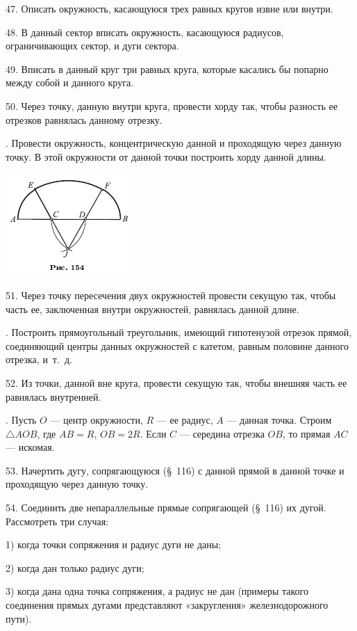 \documentclass[oneside]{book}
\begin{document}
47.
Описать окружность, касающуюся трех равных кругов извне или внутри.

48.
В данный сектор вписать окружность, касающуюся радиусов, ограничивающих сектор, и дуги сектора.

49.
Вписать в данный круг три равных круга, которые касались бы попарно между собой и данного круга.

50.
Через точку, данную внутри круга, провести хорду так, чтобы разность ее отрезков равнялась данному отрезку.

.
Провести окружность, концентрическую данной и проходящую через данную точку.
В этой окружности от данной точки построить хорду данной длины.

\includegraphics{pics/ris-154}

51.
Через точку пересечения двух окружностей провести секущую так, чтобы часть ее, заключенная внутри окружностей, равнялась данной длине.

.
Построить прямоугольный треугольник, имеющий гипотенузой отрезок прямой, соединяющий центры данных окружностей с катетом, равным половине данного отрезка, и~т.~д.

52.
Из точки, данной вне круга, провести секущую так, чтобы внешняя часть ее равнялась внутренней.

.
Пусть $O$ — центр окружности, $R$ — ее радиус, $A$ — данная точка.
Строим $\triangle AOB$, где $AB=R$, $OB=2R$.
Если $C$ — середина отрезка $OB$, то прямая $AC$ — искомая.

53.
Начертить дугу, сопрягающуюся (§~116) с данной прямой в данной точке и проходящую через данную точку.

54.
Соединить две непараллельные прямые сопрягающей (§~116) их дугой.
Рассмотреть три случая:

1) когда точки сопряжения и радиус дуги не даны;

2) когда дан только радиус дуги;

3) когда дана одна точка сопряжения, а радиус не дан (примеры такого соединения прямых дугами представляют «закругления» железнодорожного пути).
\end{document}
